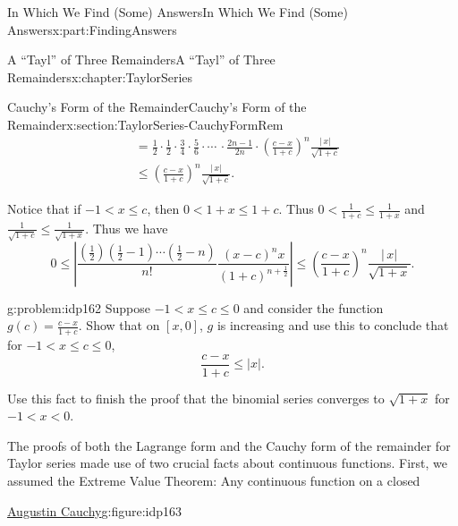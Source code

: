 \documentclass[oneside,10pt,]{book}
\numberwithin{equation}{section}
\newcommand{\lt}{<}
\newcommand{\amp}{&}
\begin{document}
\begin{partptx}{In Which We Find (Some) Answers}{}{In Which We Find (Some) Answers}{}{}{x:part:FindingAnswers}
\begin{chapterptx}{A ``Tayl'' of Three Remainders}{}{A ``Tayl'' of Three Remainders}{}{}{x:chapter:TaylorSeries}
\begin{sectionptx}{Cauchy's Form of the Remainder}{}{Cauchy's Form of the Remainder}{}{}{x:section:TaylorSeries-CauchyFormRem}
\begin{align*}
\amp =\frac{1}{2}\cdot\frac{1}{2}\cdot\frac{3}{4}\cdot\frac{5}{6}\cdot\cdots\,\cdot\frac{2n-1}{2n}\cdot\left(\frac{c-x}{1+c}\right)^n\frac{|\,x|}{\sqrt{1+c}}\\
\amp \leq\left(\frac{c-x}{1+c}\right)^n\frac{|\,x|}{\sqrt{1+c}}\text{.}
\end{align*}
%
\par
Notice that if \(-1\lt x\leq c\),\(\) then \(0\lt 1+x\leq 1+c\). Thus \(0\lt \frac{1}{1+c}\leq\frac{1}{1+x}\) and \(\frac{1}{\sqrt{1+c}}\leq\frac{1}{\sqrt{1+x}}\). Thus we have%
\begin{equation*}
0\leq\left|\frac{\left(\frac{1}{2}\right)\left(\frac{1}{2}-1\right)\cdots\left(\frac{1}{2}-n\right)}{n!}\frac{(x-c)^nx}{(1+c)^{n+\frac{1}{2}}}\right|\leq\left(\frac{c-x}{1+c}\right)^n\frac{|\,x|}{\sqrt{1+x}}\text{.}
\end{equation*}
%
\begin{problem}{}{g:problem:idp162}%
 Suppose \(-1\lt x\leq c\leq 0\) and consider the function \(g(c)=\frac{c-x}{1+c}\). Show that on \([x,0]\), \(g\) is increasing and use this to conclude that for \(-1\lt x\leq c\leq 0\),%
\begin{equation*}
\frac{c-x}{1+c}\leq|x|\text{.}
\end{equation*}
%
\par
Use this fact to finish the proof that the binomial series converges to \(\sqrt{1+x}\) for \(-1\lt x\lt 0\).%
\end{problem}
The proofs of both the Lagrange form and the Cauchy form of the remainder for Taylor series made use of two crucial facts about continuous functions. First, we assumed the Extreme Value Theorem: Any continuous function on a closed%
\begin{figureptx}{\href{https://mathshistory.st-andrews.ac.uk/Biographies/Cauchy/}{Augustin Cauchy}\protect\footnotemark{}}{g:figure:idp163}{}%
%
\begin{image}{0.36}{0.28}{0.36}%

\end{image}
\end{figureptx}
\end{sectionptx}
\end{chapterptx}
\end{partptx}
\end{document}
